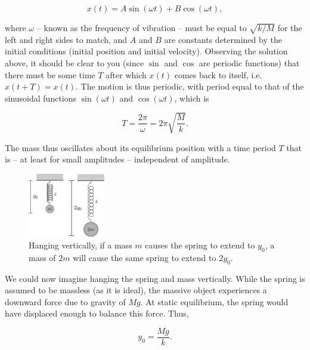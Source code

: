 \begin{refsection}
\begin{equation*}
    x(t) = A \sin(\omega t) + B \cos(\omega t),
\end{equation*}

where $\omega$ -- known as the frequency of vibration -- must be equal to $\sqrt{k/M}$ for the left and right sides to match, and $A$ and $B$ are constants determined by the initial conditions (initial position and initial velocity). Observing the solution above, it should be clear to you (since $\sin$ and $\cos$ are periodic functions) that there must be some time $T$ after which $x(t)$ comes back to itself, i.e.\ $x(t+T) = x(t)$. The motion is thus periodic, with period equal to that of the sinusoidal functions $\sin(\omega t)$ and $\cos(\omega t)$, which is

\begin{equation}
    T = \frac{2 \pi}{\omega} = 2\pi \sqrt{\frac{M}{k}}.
    \label{masslessTime}
\end{equation}

The mass thus oscillates about its equilibrium position with a time period $T$ that is -- at least for small amplitudes -- independent of amplitude.


\begin{figure}[!htb]
    \centering
    \includegraphics[width=0.3\textwidth]{figs/springMassVertical.png}
    \caption{Hanging vertically, if a mass $m$ causes the spring to extend to $y_0$, a mass of $2m$ will cause the same spring to extend to $2 y_0$.}
    \label{fig:springMassVertical}
\end{figure}


We could now imagine hanging the spring and mass vertically. While the spring is assumed to be massless (as it is ideal), the massive object experiences a downward force due to gravity of $Mg$. At static equilibrium, the spring would have displaced enough to balance this force. Thus,

\begin{equation}
    y_0 = \frac{Mg}{k}.
    \label{masslessExt}
\end{equation}


\end{refsection}
